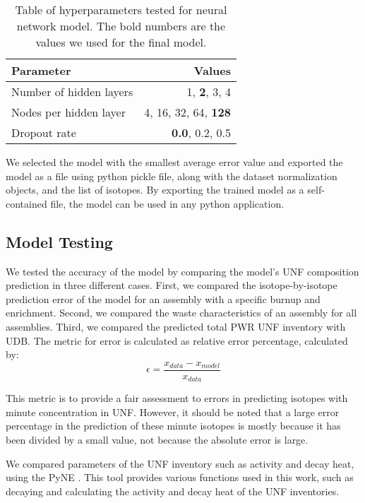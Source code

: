 \begin{table}[h]
    \centering
    \begin{tabular}{lr}
        \hline
        Parameter & Values \\
        \hline
        Number of hidden layers & 1, \textbf{2}, 3, 4 \\
        Nodes per hidden layer & 4, 16, 32, 64, \textbf{128} \\
        Dropout rate & \textbf{0.0}, 0.2, 0.5 \\
        \hline
    \end{tabular}
    \caption{Table of hyperparameters tested
             for neural network model. The bold
             numbers are the values we used for the final model.}
\end{table}


We selected the model with the smallest average error value
and exported the model as a file using python
pickle file, along with the dataset normalization objects, and 
the list of isotopes. By exporting the trained model
as a self-contained file, the model can be used in any python
application.


\subsection{Model Testing}

We tested the accuracy of the model by comparing
the model's \gls{UNF} composition prediction
in three different cases. First, we compared the
isotope-by-isotope prediction error of the model for an
assembly with a specific burnup and enrichment.
Second, we compared the waste characteristics of
an assembly for all assemblies. Third, we compared
the predicted total \gls{PWR} \gls{UNF} inventory with
\gls{UDB}. The metric for error is calculated as
relative error percentage, calculated by:
\begin{equation}
\epsilon = \frac{x_{data} - x_{model}}{x_{data}}
\end{equation}

This metric is to provide a fair assessment to errors
in predicting isotopes with minute concentration in \gls{UNF}.
However, it should be noted that a large error percentage in the
prediction of these minute isotopes is mostly because it has been
divided by a small value, not because the absolute error is large.

We compared parameters of the \gls{UNF} inventory
such as activity and decay heat, using the
\gls{PyNE} \cite{scopatz_pyne:_2012}. This tool provides
various functions used
in this work, such as decaying and calculating
the activity and decay heat of the \gls{UNF} inventories.

